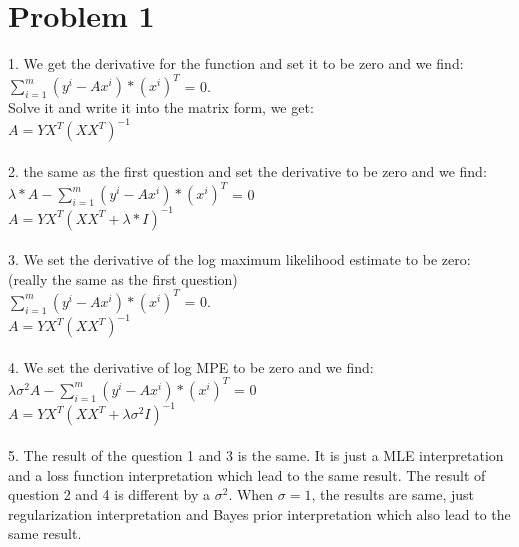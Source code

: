 \documentclass[twoside,11pt]{homework}
\begin{document}
\maketitle

\section*{Problem 1}
1. We get the derivative for the function and set it to be zero and we find: \\
	$\sum\limits_{i=1}^m (y^{i} - Ax^{i}) * (x^i)^T$ = 0. \\
	Solve it and write it into the matrix form, we get: \\ 
	$A = YX^T(XX^T)^{-1}$ \\ \\
		
2. the same as the first question and set the derivative to be zero and we find: \\
	$\lambda * A - \sum\limits_{i=1}^m (y^{i} - Ax^{i}) * (x^i)^T$ = 0 \\
	$A =  YX^T(XX^T + \lambda * I)^{-1}$ \\ \\ 
	
3. We set the derivative of the log maximum likelihood estimate to be zero: (really the same as the first question) \\
	$\sum\limits_{i=1}^m (y^{i} - Ax^{i}) * (x^i)^T$ = 0. \\
	$A = YX^T(XX^T)^{-1}$ \\ \\

4. We set the derivative of log MPE to be zero and we find: \\
	$\lambda \sigma^{2}A - \sum\limits_{i=1}^m (y^{i} - Ax^{i}) * (x^i)^T$ = 0 \\
	$A = YX^T(XX^T + \lambda \sigma^{2}I)^{-1}$ \\ \\
5.  The result of the question 1 and 3 is the same. It is just a MLE interpretation and a loss function interpretation which lead to the same result. The result of question 2 and 4 is different by a $\sigma^{2}$. When $\sigma = 1$, the results are same, just regularization interpretation and Bayes prior interpretation which also lead to the same result.
\end{document}

